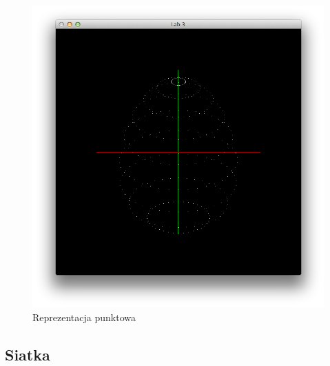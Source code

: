 \documentclass[wide,a4paper,titlepage,12pt] {article}
\begin{document}
  \begin{figure}[htbp]
    \begin{center}
      \includegraphics[scale=0.6]{points.png}
      \caption{Reprezentacja punktowa}
    \end{center}
  \end{figure}

  \newpage


  \subsection{Siatka}
  \paragraph{}

  
\end{document}
